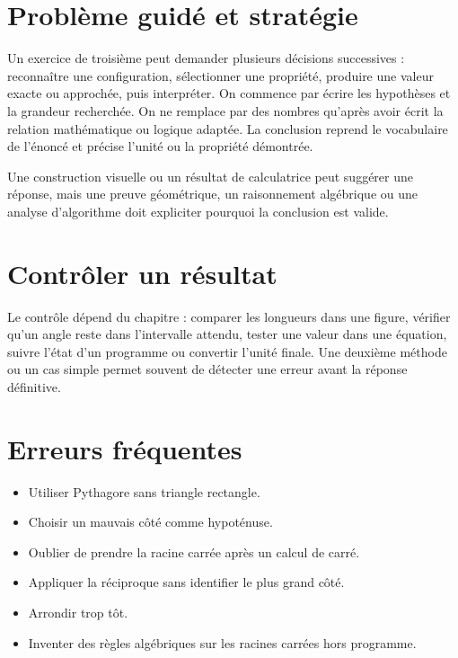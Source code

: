 \section{Problème guidé et stratégie}
Un exercice de troisième peut demander plusieurs décisions successives : reconnaître une configuration, sélectionner une propriété, produire une valeur exacte ou approchée, puis interpréter. On commence par écrire les hypothèses et la grandeur recherchée. On ne remplace par des nombres qu’après avoir écrit la relation mathématique ou logique adaptée. La conclusion reprend le vocabulaire de l’énoncé et précise l’unité ou la propriété démontrée.

\begin{attention}
Une construction visuelle ou un résultat de calculatrice peut suggérer une réponse, mais une preuve géométrique, un raisonnement algébrique ou une analyse d’algorithme doit expliciter pourquoi la conclusion est valide.
\end{attention}

\section{Contrôler un résultat}
Le contrôle dépend du chapitre : comparer les longueurs dans une figure, vérifier qu’un angle reste dans l’intervalle attendu, tester une valeur dans une équation, suivre l’état d’un programme ou convertir l’unité finale. Une deuxième méthode ou un cas simple permet souvent de détecter une erreur avant la réponse définitive.

\section{Erreurs fréquentes}
\begin{itemize}
\item Utiliser Pythagore sans triangle rectangle.
\item Choisir un mauvais côté comme hypoténuse.
\item Oublier de prendre la racine carrée après un calcul de carré.
\item Appliquer la réciproque sans identifier le plus grand côté.
\item Arrondir trop tôt.
\item Inventer des règles algébriques sur les racines carrées hors programme.
\end{itemize}

